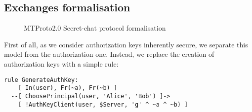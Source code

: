 \subsection{Exchanges formalisation}
\begin{figure}[!t]
  \setlength{\instdist}{3cm}
  \setmscoptions
  \begin{msc}{}



    \nextlevel[7]
    \nextlevel


    \nextlevel[6]
    \nextlevel


    \nextlevel[3]
    \nextlevel[4]

  \end{msc}

  \centering
  \caption{MTProto2.0 Secret-chat protocol formalisation}
  \label{fig:secret-chat-protocol-formalisation}
\end{figure}

First of all, as we consider authorization keys inherently secure, we separate this model from the authorization one. Instead, we replace the creation of authorization keys with a simple rule:

\begin{lstlisting}
rule GenerateAuthKey:
    [ In(user), Fr(~a), Fr(~b) ]
  --[ ChoosePrincipal(user, 'Alice', 'Bob') ]->
    [ !AuthKeyClient(user, $Server, 'g' ^ ~a ^ ~b) ]
\end{lstlisting}

